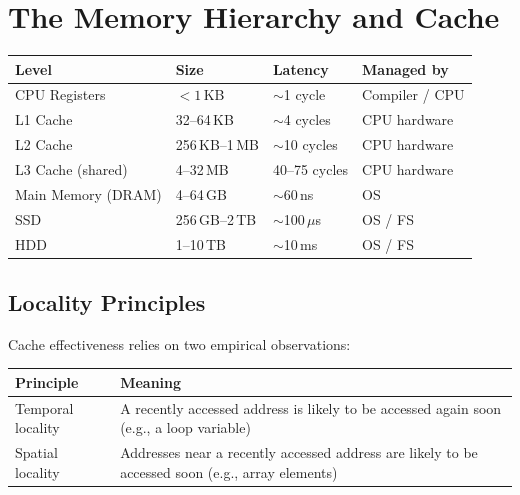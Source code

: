 \documentclass[oneside]{book}
\begin{document}
\section{The Memory Hierarchy and Cache}


\begin{center}
\begin{tabularx}{\linewidth}{llll}
\toprule
\textbf{Level} & \textbf{Size} & \textbf{Latency} & \textbf{Managed by} \\
\midrule
CPU Registers      & $< 1$\,KB  & $\sim$1 cycle       & Compiler / CPU \\
L1 Cache           & 32--64\,KB & $\sim$4 cycles      & CPU hardware \\
L2 Cache           & 256\,KB--1\,MB & $\sim$10 cycles & CPU hardware \\
L3 Cache (shared)  & 4--32\,MB  & 40--75 cycles       & CPU hardware \\
Main Memory (DRAM) & 4--64\,GB  & $\sim$60\,ns        & OS \\
SSD                & 256\,GB--2\,TB & $\sim$100\,$\mu$s & OS / FS \\
HDD                & 1--10\,TB  & $\sim$10\,ms        & OS / FS \\
\bottomrule
\end{tabularx}
\end{center}


\subsection*{Locality Principles}

Cache effectiveness relies on two empirical observations:

\begin{center}
\begin{tabularx}{\linewidth}{lX}
\toprule
\textbf{Principle} & \textbf{Meaning} \\
\midrule
Temporal locality  & A recently accessed address is likely to be accessed again soon
                     (e.g., a loop variable) \\
Spatial locality   & Addresses near a recently accessed address are likely to be
                     accessed soon (e.g., array elements) \\
\bottomrule
\end{tabularx}
\end{center}
\end{document}
